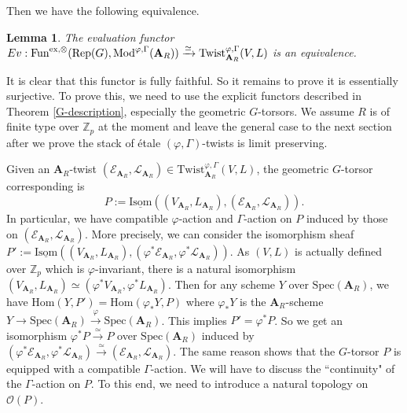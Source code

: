 \documentclass[10pt]{article}
\newtheorem{lem}[thm]{Lemma}
\numberwithin{equation}{section}
\newcommand{\bZ}{{\mathbb Z}}
\newcommand{\calE}{{\mathcal E}}
\newcommand{\calL}{{\mathcal L}}
\newcommand{\calO}{{\mathcal O}}
\newcommand{\Hom}{{\mathrm{Hom}}}           %
\newcommand{\Isom}{{\mathrm{Isom}}}         %
\newcommand{\Mod}{{\mathrm{Mod}}}           %
\newcommand{\Rep}{{\mathrm{Rep}}}           %
\newcommand{\Spec}{{\mathrm{Spec}}}         %
\newcommand{\bfA}{{\textbf{A}}}
\newcommand{\Fun}{\mathrm{Fun}}
\newcommand{\Twist}{\mathrm{Twist}}
\newcommand{\disc}{\mathrm{disc}}
\begin{document}
Then we have the following equivalence.

\begin{lem}\label{Lemma-Gamma}
    The evaluation functor $Ev:\Fun^{{\rm ex},\otimes}(\Rep(G),\Mod^{\varphi,\Gamma}(\bfA_R))\xrightarrow{\simeq} \Twist^{\varphi,\Gamma}_{\bfA_R}(V,L)$ is an equivalence.
\end{lem}

It is clear that this functor is fully faithful. So it remains to prove it is essentially surjective. To prove this, we need to use the explicit functors described in Theorem \ref{G-description}, especially the geometric $G$-torsors. We assume $R$ is of finite type over $\bZ_p$ at the moment and leave the general case to the next section after we prove the stack of \'etale $(\varphi,\Gamma)$-twists is limit preserving.


Given an $\bfA_R$-twist $(\calE_{\bfA_R},\calL_{\bfA_R})\in \Twist^{\varphi,\Gamma}_{\bfA_R}(V,L)$, the geometric $G$-torsor corresponding is \[P:=\underline\Isom((V_{\bfA_R},L_{\bfA_R}),(\calE_{\bfA_R},\calL_{\bfA_R})).\] In particular, we have compatible $\varphi$-action and $\Gamma$-action on $P$ induced by those on $(\calE_{\bfA_R},\calL_{\bfA_R})$. More precisely, we can consider the isomorphism sheaf $P':=\underline\Isom((V_{\bfA_R},L_{\bfA_R}),(\varphi^*\calE_{\bfA_R},\varphi^*\calL_{\bfA_R}))$. As $(V,L)$ is actually defined over $\bZ_p$ which is $\varphi$-invariant, there is a natural isomorphism $(V_{\bfA_R},L_{\bfA_R})\simeq (\varphi^*V_{\bfA_R},\varphi^*L_{\bfA_R})$. Then for any scheme $Y$ over $\Spec(\bfA_R)$, we have $\Hom(Y,P')=\Hom(\varphi_*Y,P)$ where $\varphi_*Y$ is the $\bfA_R$-scheme $Y\to \Spec(\bfA_R)\xrightarrow{\varphi}\Spec(\bfA_R)$. This implies $P'=\varphi^*P$. So we get an isomorphism $\varphi^*P\xrightarrow{\simeq}P$ over $\Spec(\bfA_R)$ induced by $(\varphi^*\calE_{\bfA_R},\varphi^*\calL_{\bfA_R})\xrightarrow{\simeq}(\calE_{\bfA_R},\calL_{\bfA_R})$. The same reason shows that the $G$-torsor $P$ is equipped with a compatible $\Gamma$-action. We will have to discuss the ``continuity" of the $\Gamma$-action on $P$. To this end, we need to introduce a natural topology on $\calO(P)$.
\end{document}
